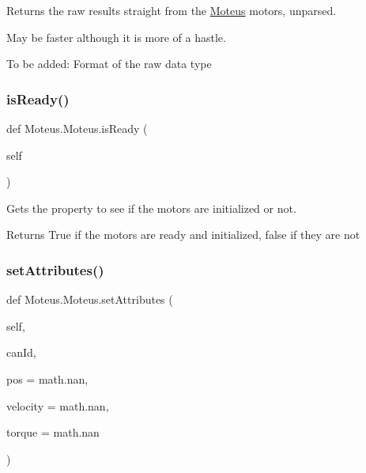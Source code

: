 Returns the raw results straight from the \hyperlink{classMoteus_1_1Moteus}{Moteus} motors, unparsed. 

May be faster although it is more of a hastle. \begin{DoxyVerb}       To be added: Format of the raw data type\end{DoxyVerb}
 \mbox{\label{classMoteus_1_1Moteus_a2e1ae006212c2b107a6b63478b1137cb}} 
\subsubsection{\texorpdfstring{is\+Ready()}{isReady()}}
{\footnotesize\ttfamily def Moteus.\+Moteus.\+is\+Ready (\begin{DoxyParamCaption}\item[{}]{self }\end{DoxyParamCaption})}



Gets the property to see if the motors are initialized or not. 

\begin{DoxyReturn}{Returns}
True if the motors are ready and initialized, false if they are not 
\end{DoxyReturn}
\mbox{\label{classMoteus_1_1Moteus_a75698a813e2463f3c245a4b7fa07b2a0}} 
\subsubsection{\texorpdfstring{set\+Attributes()}{setAttributes()}}
{\footnotesize\ttfamily def Moteus.\+Moteus.\+set\+Attributes (\begin{DoxyParamCaption}\item[{}]{self,  }\item[{}]{can\+Id,  }\item[{}]{pos = {\ttfamily math.nan},  }\item[{}]{velocity = {\ttfamily math.nan},  }\item[{}]{torque = {\ttfamily math.nan} }\end{DoxyParamCaption})}



